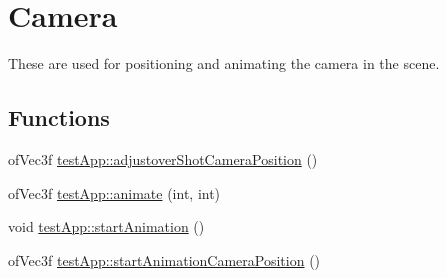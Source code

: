 \hypertarget{group___camera}{\section{Camera}
\label{group___camera}
}


These are used for positioning and animating the camera in the scene.  


\subsection*{Functions}
\begin{DoxyCompactItemize}
\item 
of\-Vec3f \hyperlink{group___camera_ga2a792bfdf269fd69951cbf97d4f574af}{test\-App\-::adjustover\-Shot\-Camera\-Position} ()
\item 
of\-Vec3f \hyperlink{group___camera_ga1facfe2200dae7ad147b8f9ab31f68c6}{test\-App\-::animate} (int, int)
\item 
void \hyperlink{group___camera_ga79467453f6ea0dd63961a810dca9ac6a}{test\-App\-::start\-Animation} ()
\item 
of\-Vec3f \hyperlink{group___camera_ga1a97063e992528dc79867e516d9365f0}{test\-App\-::start\-Animation\-Camera\-Position} ()
\end{DoxyCompactItemize}
